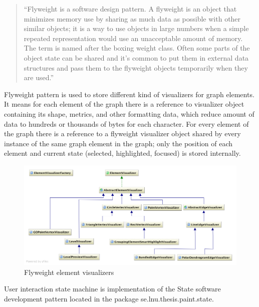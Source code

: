 \begin{quotation}
``Flyweight is a software design pattern.
A flyweight is an object that minimizes memory use by sharing as much data as possible with other similar objects;
it is a way to use objects in large numbers when a simple repeated representation would use an unacceptable amount of memory.
The term is named after the boxing weight class.
Often some parts of the object state can be shared and it's common to put them in external data structures and pass them to
the flyweight objects temporarily when they are used.''~\cite{FLYWEIGHT}
\end{quotation}

Flyweight pattern is used to store different kind of visualizers for graph elements. It means for each element of the graph there is a reference to visualizer object containing its shape, metrics, and other formatting data, which reduce amount of data to hundreds or thousands of bytes for each character. For every element of the graph there is a reference to a flyweight visualizer object shared by every instance of the same graph element in the graph; only the position of each element and current state (selected, highlighted, focused) is stored internally.

\begin{figure}[h!]
\centering
\includegraphics[scale=0.35]{pictures/uml_visualizers.png}
\caption{Flyweight element visualizers}
\label{fig:uml_visualizers}
\end{figure}

User interaction state machine is implementation of the State software development pattern located in the package \textsf{se.lnu.thesis.paint.state}.

